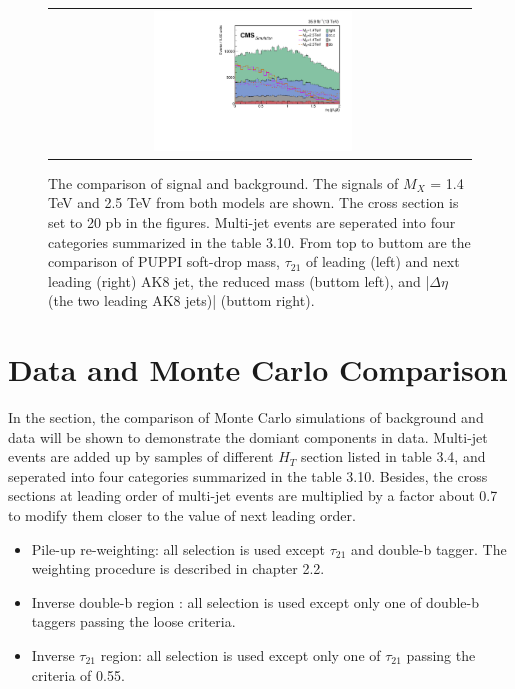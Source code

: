 \begin{figure}[t]
\begin{tabular}{cc}
    \includegraphics[width=0.5\textwidth]{Figures/MC_N1/deltaEta.pdf} \\
  \end{tabular}
  \caption{The comparison of signal and background. The signals of $M_{X}$ = 1.4 TeV and 2.5 TeV from both models are shown. The cross section is set to 20 pb in the figures. Multi-jet events are seperated into four categories summarized in the table 3.10. From top to buttom are the comparison of PUPPI soft-drop mass, $\tau _{21}$ of leading (left) and next leading (right) AK8 jet, the reduced mass (buttom left), and |$\Delta \eta $ (the two leading AK8 jets)| (buttom right).}
  \label{fig:hvt_brs}
\end{figure}

\section{Data and Monte Carlo Comparison} 
In the section, the comparison of Monte Carlo simulations of background and data will be shown to demonstrate the domiant components in data. Multi-jet events are added up by samples of different $H_T$ section listed in table 3.4, and seperated into four categories summarized in the table 3.10. Besides, the cross sections at leading order of multi-jet events are multiplied by a factor about 0.7 to modify them closer to the value of next leading order.


\begin{itemize}
\item Pile-up re-weighting: all selection is used except $\tau _{21}$ and double-b tagger. The weighting procedure is described in chapter 2.2.
\item Inverse double-b region : all selection is used except only one of double-b taggers passing the loose criteria.
\item Inverse $\tau _{21}$ region: all selection is used except only one of $\tau _{21}$ passing the criteria of 0.55.
\end{itemize} 

